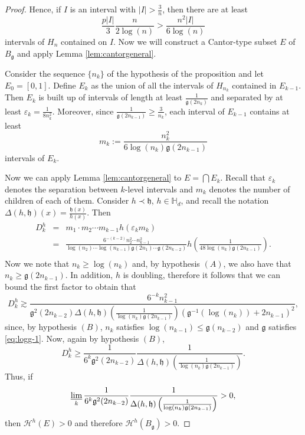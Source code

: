 \documentclass[11pt,a4paper]{amsart}
\begin{document}
\begin{proof}
Hence, if $I$ is an interval with $|I|>\frac{3}{n}$, then there
are at least
\[
\frac{p|I|}{3}\frac{n}{2\log(n)}>\frac{n^2|I|}{6\log(n)}
\]
intervals of $H_n$ contained on $I$. Now we will construct a
Cantor-type subset $E$ of $B_{\mathfrak{g}}$ and apply
Lemma \ref{lem:cantorgeneral}.

Consider the sequence $\{n_k\}$ of the hypothesis of the
proposition and let $E_0=[0,1]$. Define $E_{k}$ as the union of
all the intervals of $H_{n_{k}}$ contained in $E_{k-1}$. Then
$E_k$ is built up of intervals of length at least
$\frac{1}{{\mathfrak{g}}(2n_k)}$ and separated by at least
${\varepsilon}_k=\frac{1}{8n_k^2}$. Moreover, since
$\frac{1}{{\mathfrak{g}}(2n_{k-1})}\ge \frac{3}{n_k}$, each interval of
$E_{k-1}$ contains at least
\[
m_k:=\frac{n_k^2}{6\log(n_k){\mathfrak{g}}(2n_{k-1})}
\]
intervals of $E_k$.

Now we can apply Lemma \ref{lem:cantorgeneral} to $E=\bigcap E_k$. Recall that ${\varepsilon}_k$ denotes the separation between $k$-level intervals and $m_k$ denotes the number of children of each of them. Consider $h\prec{\mathfrak{h}}$, $h\in {\mathbb{H}}_d$, and recall the notation $\Delta(h,{\mathfrak{h}})(x)=\frac{{\mathfrak{h}}(x)}{h(x)}$. Then
\begin{eqnarray*}
 D^h_k & = & m_1\cdot m_2\cdots m_{k-1}h({\varepsilon}_km_k)\\
    & = & \frac{6^{-(k-2)}n^2_2\cdots n^2_{k-1}}{\log(n_2)\cdots\log(n_{k-1}){\mathfrak{g}}(2n_1)\cdots{\mathfrak{g}}(2n_{k-2})}h\left(\frac{1}{48\log(n_k){\mathfrak{g}}(2n_{k-1})}\right).\\
\end{eqnarray*}
Now we note that $n_k\ge \log(n_k)$ and, by hypothesis $(A)$, we
also have that  $n_k\ge{\mathfrak{g}}(2n_{k-1})$. In addition,
$h$ is doubling, therefore it follows that we can bound the first
factor to obtain that
\begin{equation*}
    D^h_k \gtrsim \frac{6^{-k}n^2_{k-1}}{{\mathfrak{g}}^{2}(2n_{k-2})\Delta(h,{\mathfrak{h}})\left(\frac{1}{\log(n_k){\mathfrak{g}}(2n_{k-1})}\right){\left({\mathfrak{g}}^{-1}(\log(n_k))+2n_{k-1}\right)^2}},
\end{equation*}
since, by hypothesis $(B)$, $n_k$ satisfies $\log(n_{k-1})\le
{\mathfrak{g}}(n_{k-2})$ and ${\mathfrak{g}}$ satisfies \eqref{eq:logg-1}. Now, again
by hypothesis $(B)$,
\begin{equation*}
D^h_k \ge
\frac{1}{6^k{\mathfrak{g}}^{2}(2n_{k-2})}\frac{1}{\Delta(h,{\mathfrak{h}})\left(\frac{1}{\log(n_{k}){\mathfrak{g}}(2n_{k-1})}\right)}.
\end{equation*}
Thus, if
\[
\varliminf_k\frac{1}{6^k{\mathfrak{g}}^{2}(2n_{k-2})}\frac{1}{\Delta(h,{\mathfrak{h}})\left(\frac{1}{\log(n_{k}){\mathfrak{g}}(2n_{k-1})}\right)}
>0,
\]
then ${\mathcal{H}^{{h}}}(E)>0$ and therefore ${\mathcal{H}^{{h}}}(B_{\mathfrak{g}})>0$.
\end{proof}
\end{document}
